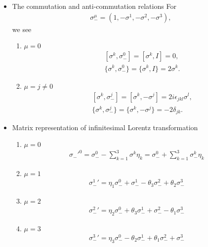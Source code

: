 \documentclass[11pt]{article}
\begin{document}
\section{ }
\begin{itemize}
    \item The commutation and anti-commutation relations
    For
    \begin{eqnarray}
        \sigma_-^\mu=(1,-\sigma^1,-\sigma^2,-\sigma^3),
    \end{eqnarray}
    we see
    \begin{enumerate}
        \item $\mu=0$
        \begin{eqnarray}
            &&[\sigma^k,\sigma_-^0]=[\sigma^k,I]=0, \\
            &&\{\sigma^k,\sigma_-^0\}= \{\sigma^k,I \}= 2 \sigma^k.
        \end{eqnarray}
        \item $\mu=j\neq 0$
        \begin{eqnarray}
            &&[\sigma^k,\sigma_-^j]=[\sigma^k,-\sigma^j]=2i\epsilon_{jkl}\sigma^l, \\
            &&\{\sigma^k,\sigma_-^j\}= \{\sigma^k,-\sigma^j \}= -2 \delta_{jk}.
        \end{eqnarray}
    \end{enumerate}
    \item Matrix representation of infinitesimal Lorentz transformation
    \begin{enumerate}
        \item $\mu=0$
        \begin{eqnarray}
            {\sigma_-'}^0 =\sigma_-^0-\sum_{k=1}^3\sigma^k\eta_k=\sigma_-^0+\sum_{k=1}^3\sigma_-^k\eta_k
        \end{eqnarray}
        \item $\mu=1$
        \begin{eqnarray}
            {\sigma_-^1}'=\eta_1\sigma_-^0+\sigma_-^1-\theta_3\sigma_-^2+\theta_2\sigma_-^3
        \end{eqnarray}
        \item $\mu=2$
        \begin{eqnarray}
            {\sigma_-^2}'=\eta_2\sigma_-^0+\theta_3\sigma_-^1+\sigma_-^2-\theta_1\sigma_-^3
        \end{eqnarray}
        \item $\mu=3$
        \begin{eqnarray}
            {\sigma_-^3}'=\eta_3\sigma_-^0-\theta_2\sigma_-^1+\theta_1\sigma_-^2+\sigma_-^3

\end{eqnarray}
\end{enumerate}
\end{itemize}
\end{document}
